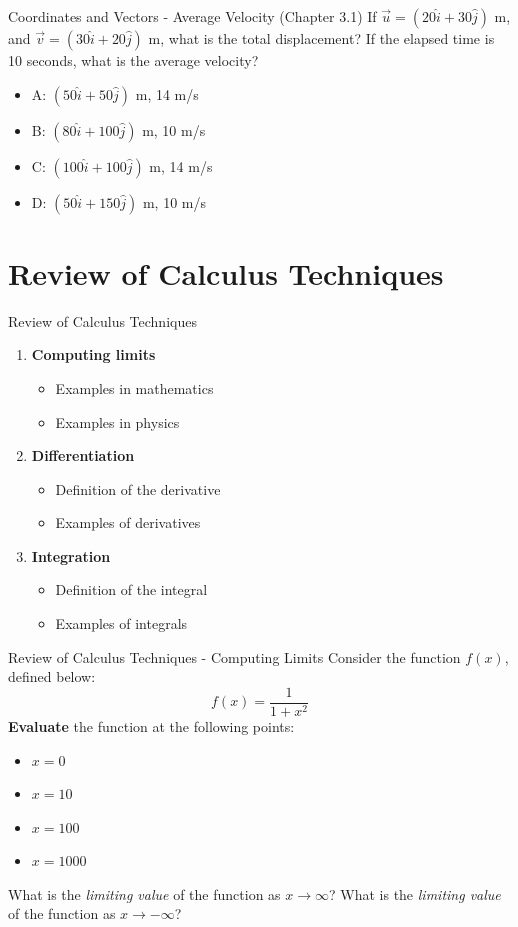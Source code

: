 \documentclass{beamer}
\begin{document}
\begin{frame}{Coordinates and Vectors - Average Velocity (Chapter 3.1)}
If $\vec{u} = (20\hat{i}+30\hat{j})$ m, and $\vec{v} = (30\hat{i}+20\hat{j})$ m, what is the total displacement?  If the elapsed time is 10 seconds, what is the average velocity? \\
\vspace{0.2cm}
\begin{itemize}
\item A: $(50\hat{i} + 50\hat{j})$ m, 14 m/s
\item B: $(80\hat{i} + 100\hat{j})$ m, 10 m/s
\item C: $(100\hat{i} + 100\hat{j})$ m, 14 m/s
\item D: $(50\hat{i} + 150\hat{j})$ m, 10 m/s
\end{itemize}
\end{frame}

\section{Review of Calculus Techniques}

\begin{frame}{Review of Calculus Techniques}
\begin{enumerate}
\item \textbf{Computing limits}
\begin{itemize}
\item Examples in mathematics
\item Examples in physics
\end{itemize}
\item \textbf{Differentiation}
\begin{itemize}
\item Definition of the derivative
\item Examples of derivatives
\end{itemize}
\item \textbf{Integration}
\begin{itemize}
\item Definition of the integral
\item Examples of integrals
\end{itemize}
\end{enumerate}
\end{frame}

\begin{frame}{Review of Calculus Techniques - Computing Limits}
\small
Consider the function $f(x)$, defined below:
\begin{equation}
f(x) = \frac{1}{1+x^2}
\end{equation}
\textbf{Evaluate} the function at the following points:
\begin{itemize}
\item $x = 0$
\item $x = 10$
\item $x = 100$
\item $x = 1000$
\end{itemize}
What is the \textit{limiting value} of the function as $x \to \infty$?  What is the \textit{limiting value} of the function as $x \to -\infty$?
\end{frame}
\end{document}
